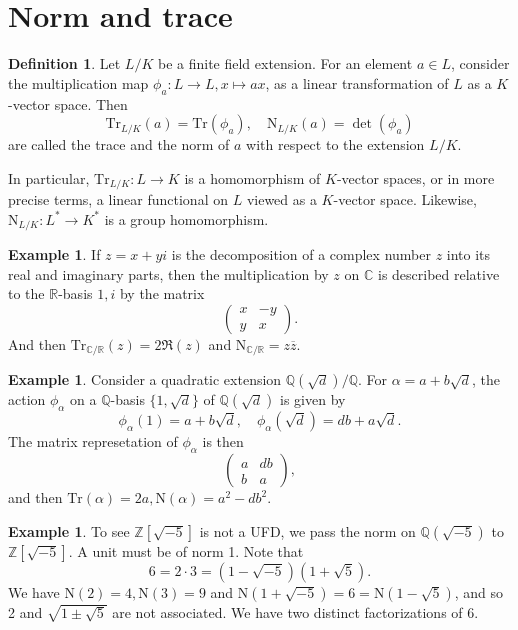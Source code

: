 \documentclass[12pt]{report}
\theoremstyle{definition}
\newtheorem{definition}[theorem]{Definition}
\newtheorem{example}[theorem]{Example}
\newcommand{\ZZ}{\mathbb{Z}}
\newcommand{\CC}{\mathbb{C}}
\newcommand{\QQ}{\mathbb{Q}}
\newcommand{\RR}{\mathbb{R}}
\newcommand{\Tr}{\text{Tr}}
\newcommand{\nm}{\text{N}}
\begin{document}
\section{Norm and trace}

\begin{definition}
	Let $L/K$ be a finite field extension. For an element $a \in L$, consider the multiplication map $\phi_a : L \to L, x \mapsto ax$, as a linear transformation of $L$ as a $K$-vector space. Then $$\Tr_{L/K}(a)= \Tr(\phi_a),\quad \nm_{L/K}(a) = \det(\phi_a)$$ are called the trace and the norm of $a$ with respect to the extension $L/K$.
\end{definition}

In particular, $\Tr_{L/K} : L \to K$ is a homomorphism of $K$-vector spaces, or in more precise terms, a linear functional on $L$ viewed as a $K$-vector space. Likewise, $\nm_{L/K} : L^* \to K^*$ is a group homomorphism.

\begin{example}
	If $z = x+yi$ is the decomposition of a complex number $z$ into its real and imaginary parts, then the multiplication by $z$ on $\CC$ is described relative to the $\RR$-basis $1, i$ by the matrix $$    \begin{pmatrix}
			x & -y \\
			y & x
		\end{pmatrix}.$$
	And then $\Tr_{\CC/\RR}(z)= 2\Re(z)$ and $\nm_{\CC/\RR} = z\overline{z}$.
\end{example}

\begin{example}
	Consider a quadratic extension $\QQ(\sqrt{d})/\QQ$. For $\alpha=a+b\sqrt{d}$, the action $\phi_\alpha$ on a $\QQ$-basis $\{1,\sqrt{d}\}$ of $\QQ(\sqrt{d})$ is given by $$\phi_\alpha(1)=a+b\sqrt{d},\quad \phi_\alpha(\sqrt{d})=db+a\sqrt{d}.$$ The matrix represetation of $\phi_\alpha$ is then $$\begin{pmatrix}
			a & db \\
			b & a
		\end{pmatrix},$$ and then $\Tr(\alpha)=2a, \nm(\alpha)=a^2-db^2.$
\end{example}

\begin{example}
	To see $\ZZ[\sqrt{-5}]$ is not a UFD, we pass the norm on $\QQ(\sqrt{-5})$ to $\ZZ[\sqrt{-5}]$. A unit must be of norm 1. Note that $$6=2\cdot 3=(1-\sqrt{-5})(1+\sqrt{5}).$$ We have $\nm(2)=4,\nm(3)=9$ and $\nm(1+\sqrt{-5})=6=\nm(1-\sqrt{5})$, and so 2 and $\sqrt{1\pm\sqrt{5}}$ are not associated. We have two distinct factorizations of 6.
\end{example}
\end{document}
